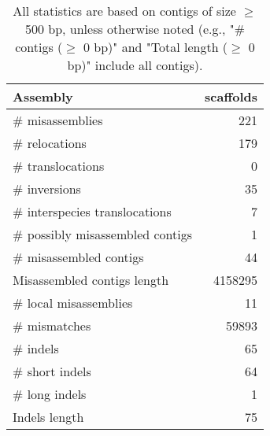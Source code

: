 \documentclass[12pt,a4paper]{article}
\begin{document}
\begin{table}[ht]
\begin{center}
\caption{All statistics are based on contigs of size $\geq$ 500 bp, unless otherwise noted (e.g., "\# contigs ($\geq$ 0 bp)" and "Total length ($\geq$ 0 bp)" include all contigs).}
\begin{tabular}{|l*{1}{|r}|}
\hline
Assembly & scaffolds \\ \hline
\# misassemblies & 221 \\ \hline
\hspace{5mm}\# relocations & 179 \\ \hline
\hspace{5mm}\# translocations & 0 \\ \hline
\hspace{5mm}\# inversions & 35 \\ \hline
\hspace{5mm}\# interspecies translocations & 7 \\ \hline
\# possibly misassembled contigs & 1 \\ \hline
\# misassembled contigs & 44 \\ \hline
Misassembled contigs length & 4158295 \\ \hline
\# local misassemblies & 11 \\ \hline
\# mismatches & 59893 \\ \hline
\# indels & 65 \\ \hline
\hspace{5mm}\# short indels & 64 \\ \hline
\hspace{5mm}\# long indels & 1 \\ \hline
Indels length & 75 \\ \hline
\end{tabular}
\end{center}
\end{table}
\end{document}
